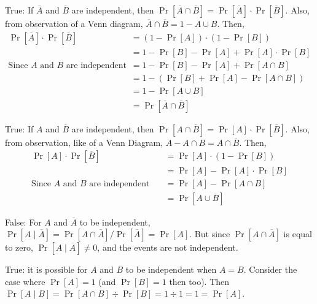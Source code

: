 \documentclass[11pt]{article}
\begin{document}
\begin{solution}

\begin{Parts}
    
\Part True: If $\overline{A}$ and $\overline{B}$ are independent, then 
$\Pr[\overline{A} \cap \overline{B}] = \Pr[\overline{A}] \cdot \Pr[\overline{B}]$.
Also, from observation of a Venn diagram, $\overline{A} \cap \overline{B} = 1 -
A \cup B$. Then, 
\[
    \begin{split}
        \Pr[\overline{A}] \cdot \Pr[\overline{B}] &= (1-\Pr[A]) \cdot (1-\Pr[B]) \\
        &= 1 - \Pr[B] - \Pr[A] + \Pr[A] \cdot \Pr[B] \\
        \text{Since $A$ and $B$ are independent} \quad &= 
        1 - \Pr[B] - \Pr[A] + \Pr[A \cap B] \\
        &= 1 - (\Pr[B] + \Pr[A] - \Pr[A \cap B]) \\ 
        &= 1 - \Pr[A \cup B] \\ 
        &= \Pr[\overline{A} \cap \overline{B}]
    \end{split}
\]

\Part True: If $A$ and $\overline{B}$ are independent, then 
$\Pr[A \cap \overline{B}] = \Pr[A] \cdot \Pr[\overline{B}]$. Also, from
observation, like of a Venn Diagram, $A - A \cap B = A \cap \overline{B}$. Then,
\[
    \begin{split}
        \Pr[A] \cdot \Pr[\overline{B}] &= \Pr[A] \cdot (1 - \Pr[B]) \\
        &= \Pr[A] - \Pr[A] \cdot \Pr[B] \\
        \text{Since $A$ and $B$ are independent} \quad
        &= \Pr[A] - \Pr[A \cap B] \\
        &= \Pr[A \cup \overline{B}]
    \end{split}
\]

\Part False: For $A$ and $\overline{A}$ to be independent, $\Pr[A \mid \overline{A}]
= \Pr[A \cap \overline{A}] / \Pr[\overline{A}] = \Pr[A]$. But since $\Pr[A \cap 
\overline{A}]$ is equal to zero, $\Pr[A \mid \overline{A}] \neq 0$, and the
events are not independent. 

\Part True: it is possible for $A$ and $B$ to be independent when $A=B$. Consider
the case where $\Pr[A] = 1$ (and $\Pr[B] = 1$ then too). Then $\Pr[A \mid B] = 
\Pr[A \cap B] \div \Pr[B] = 1 \div 1 = 1 = \Pr[A]$. 

\end{Parts}

\end{solution}
\end{document}
